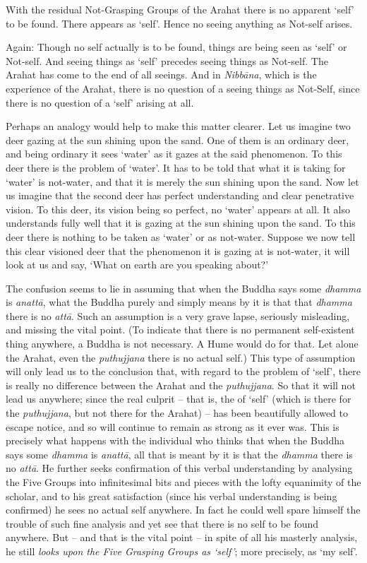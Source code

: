 With the residual Not-Grasping Groups of the Arahat there is no apparent `self' to be found. There  appears as `self'. Hence no seeing anything as Not-self arises.

Again: Though no self actually is to be found, things are being seen as `self' or Not-self. And seeing things as `self' precedes seeing things as Not-self. The Arahat has come to the end of all seeings. And in \emph{Nibbāna}, which is the experience of the Arahat, there is no question of a seeing things as Not-Self, since there is no question of a `self' arising at all.

Perhaps an analogy would help to make this matter clearer. Let us imagine two deer gazing at the sun shining upon the sand. One of them is an ordinary deer, and being ordinary it sees `water' as it gazes at the said phenomenon. To this deer there is the problem of `water'. It has to be told that what it is taking for `water' is not-water, and that it is merely the sun shining upon the sand. Now let us imagine that the second deer has perfect understanding and clear penetrative vision. To this deer, its vision being so perfect, no `water' appears at all. It also understands fully well that it is gazing at the sun shining upon the sand. To this deer there is nothing to be taken as `water' or as not-water. Suppose we now tell this clear visioned deer that the phenomenon it is gazing at is not-water, it will look at us and say, `What on earth are you speaking about?'

The confusion seems to lie in assuming that when the Buddha says some \emph{dhamma} is \emph{anattā}, what the Buddha purely and simply means by it is that  that \emph{dhamma} there is no \emph{attā}. Such an assumption is a very grave lapse, seriously misleading, and missing the vital point. (To indicate that there is no permanent self-existent thing anywhere, a Buddha is not necessary. A Hume would do for that. Let alone  the Arahat, even  the \emph{puthujjana} there is no actual self.) This type of assumption will only lead us to the conclusion that, with regard to the problem of `self', there is really no difference between the Arahat and the \emph{puthujjana}. So that it will not lead us anywhere; since the real culprit -- that is, the  of `self' (which is there for the \emph{puthujjana}, but not there for the Arahat) -- has been beautifully allowed to escape notice, and so will continue to remain as strong as it ever was. This is precisely what happens with the individual who thinks that when the Buddha says some \emph{dhamma} is \emph{anattā}, all that is meant by it is that  the \emph{dhamma} there is no \emph{attā}. He further seeks confirmation of this verbal understanding by analysing the Five Groups into infinitesimal bits and pieces with the lofty equanimity of the scholar, and to his great satisfaction (since his verbal understanding is being confirmed) he sees no actual self anywhere. In fact he could well spare himself the trouble of such fine analysis and yet see that there is no self to be found anywhere. But -- and that is the vital point -- in spite of all his masterly analysis, he still \emph{looks upon the Five Grasping Groups as `self'}; more precisely, as `my self'.

